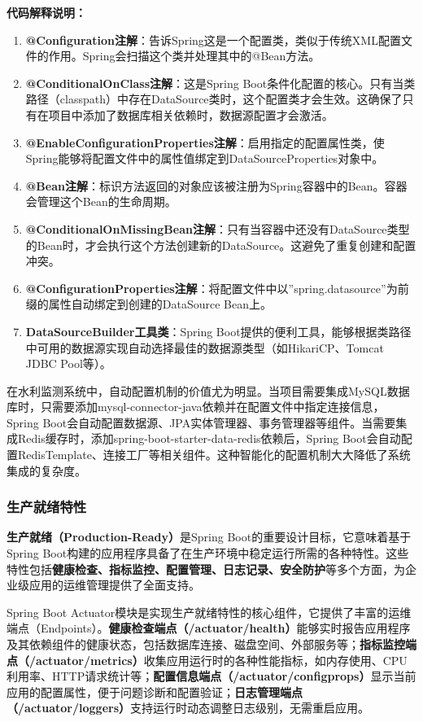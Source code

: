 \textbf{代码解释说明：}

\begin{enumerate}
\def\labelenumi{\arabic{enumi}.}
\item
  \textbf{@Configuration注解}：告诉Spring这是一个配置类，类似于传统XML配置文件的作用。Spring会扫描这个类并处理其中的@Bean方法。
\item
  \textbf{@ConditionalOnClass注解}：这是Spring Boot条件化配置的核心。只有当类路径（classpath）中存在DataSource类时，这个配置类才会生效。这确保了只有在项目中添加了数据库相关依赖时，数据源配置才会激活。
\item
  \textbf{@EnableConfigurationProperties注解}：启用指定的配置属性类，使Spring能够将配置文件中的属性值绑定到DataSourceProperties对象中。
\item
  \textbf{@Bean注解}：标识方法返回的对象应该被注册为Spring容器中的Bean。容器会管理这个Bean的生命周期。
\item
  \textbf{@ConditionalOnMissingBean注解}：只有当容器中还没有DataSource类型的Bean时，才会执行这个方法创建新的DataSource。这避免了重复创建和配置冲突。
\item
  \textbf{@ConfigurationProperties注解}：将配置文件中以''spring.datasource''为前缀的属性自动绑定到创建的DataSource Bean上。
\item
  \textbf{DataSourceBuilder工具类}：Spring Boot提供的便利工具，能够根据类路径中可用的数据源实现自动选择最佳的数据源类型（如HikariCP、Tomcat JDBC Pool等）。
\end{enumerate}

在水利监测系统中，自动配置机制的价值尤为明显。当项目需要集成MySQL数据库时，只需要添加mysql-connector-java依赖并在配置文件中指定连接信息，Spring Boot会自动配置数据源、JPA实体管理器、事务管理器等组件。当需要集成Redis缓存时，添加spring-boot-starter-data-redis依赖后，Spring Boot会自动配置RedisTemplate、连接工厂等相关组件。这种智能化的配置机制大大降低了系统集成的复杂度。

\subsubsection{生产就绪特性}\label{ux751fux4ea7ux5c31ux7eeaux7279ux6027}

\textbf{生产就绪（Production-Ready）}是Spring Boot的重要设计目标，它意味着基于Spring Boot构建的应用程序具备了在生产环境中稳定运行所需的各种特性。这些特性包括\textbf{健康检查、指标监控、配置管理、日志记录、安全防护}等多个方面，为企业级应用的运维管理提供了全面支持。

Spring Boot Actuator模块是实现生产就绪特性的核心组件，它提供了丰富的运维端点（Endpoints）。\textbf{健康检查端点（/actuator/health）}能够实时报告应用程序及其依赖组件的健康状态，包括数据库连接、磁盘空间、外部服务等；\textbf{指标监控端点（/actuator/metrics）}收集应用运行时的各种性能指标，如内存使用、CPU利用率、HTTP请求统计等；\textbf{配置信息端点（/actuator/configprops）}显示当前应用的配置属性，便于问题诊断和配置验证；\textbf{日志管理端点（/actuator/loggers）}支持运行时动态调整日志级别，无需重启应用。

